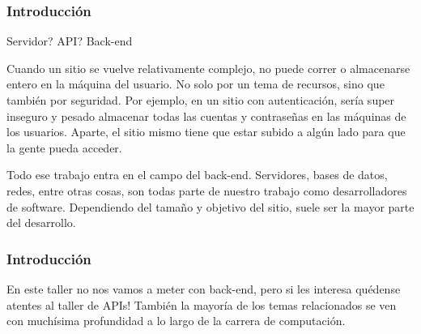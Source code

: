 \begin{frame}
    \frametitle{Introducción}
    \begin{tcolorbox}[colframe=color1]
        \begin{center}
            Servidor? API? Back-end
        \end{center}
    \end{tcolorbox}

    Cuando un sitio se vuelve relativamente complejo, no puede correr 
    o almacenarse entero en la máquina del usuario. No solo por un tema 
    de recursos, sino que también por seguridad. Por ejemplo, en un sitio 
    con autenticación, sería super inseguro y pesado almacenar todas las 
    cuentas y contraseñas en las máquinas de los usuarios. Aparte, el 
    sitio mismo tiene que estar subido a algún lado para que la gente pueda 
    acceder.

    Todo ese trabajo entra en el campo del back-end. Servidores, bases de 
    datos, redes, entre otras cosas, son todas parte de nuestro trabajo 
    como desarrolladores de software. Dependiendo del tamaño y objetivo del 
    sitio, suele ser la mayor parte del desarrollo.

\end{frame}

\begin{frame}
    \frametitle{Introducción}

    En este taller no nos vamos a meter con back-end, pero si les interesa 
    quédense atentes al taller de APIs! También la mayoría de los temas 
    relacionados se ven con muchísima profundidad a lo largo de la carrera 
    de computación.

\end{frame}

